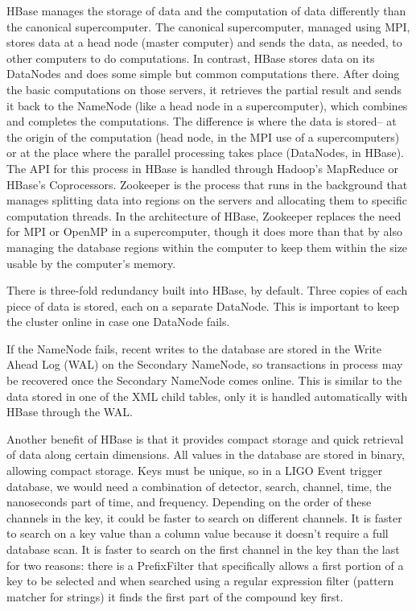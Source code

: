 \documentclass{article}
\begin{document}
HBase manages the storage of data and the computation of data
differently than the canonical supercomputer. The canonical
supercomputer, managed using MPI, stores data at a head node (master
computer) and sends the data, as needed, to other computers to do
computations. In contrast, HBase stores data on its DataNodes and does
some simple but common computations there. After doing the basic
computations on those servers, it retrieves the partial result and
sends it back to the NameNode (like a head node in a supercomputer),
which combines and completes the computations. The difference is where
the data is stored-- at the origin of the computation (head node, in
the MPI use of a supercomputers) or at the place where the parallel
processing takes place (DataNodes, in HBase). The API for this process
in HBase is handled through Hadoop's MapReduce or HBase's
Coprocessors. Zookeeper is the process that runs in the background
that manages splitting data into regions on the servers and allocating
them to specific computation threads. In the architecture of HBase,
Zookeeper replaces the need for MPI or OpenMP in a supercomputer,
though it does more than that by also managing the database regions
within the computer to keep them within the size usable by the
computer's memory.

There is three-fold redundancy built into HBase, by default. Three
copies of each piece of data is stored, each on a separate
DataNode. This is important to keep the cluster online in case one
DataNode fails.

If the NameNode fails, recent writes to the database are stored in the
Write Ahead Log (WAL) on the Secondary NameNode, so transactions in
process may be recovered once the Secondary NameNode comes
online. This is similar to the data stored in one of the XML child
tables, only it is handled automatically with HBase through the WAL.


Another benefit of HBase is that it provides compact storage and quick
retrieval of data along certain dimensions. All values in the database
are stored in binary, allowing compact storage. Keys must be unique,
so in a LIGO Event trigger database, we would need a combination of
detector, search, channel, time, the nanoseconds part of time, and
frequency. Depending on the order of these channels in the key, it
could be faster to search on different channels. It is faster to
search on a key value than a column value because it doesn't require a
full database scan. It is faster to search on the first channel in the
key than the last for two reasons: there is a PrefixFilter that
specifically allows a first portion of a key to be selected and when
searched using a regular expression filter (pattern matcher for
strings) it finds the first part of the compound key first.
\end{document}
